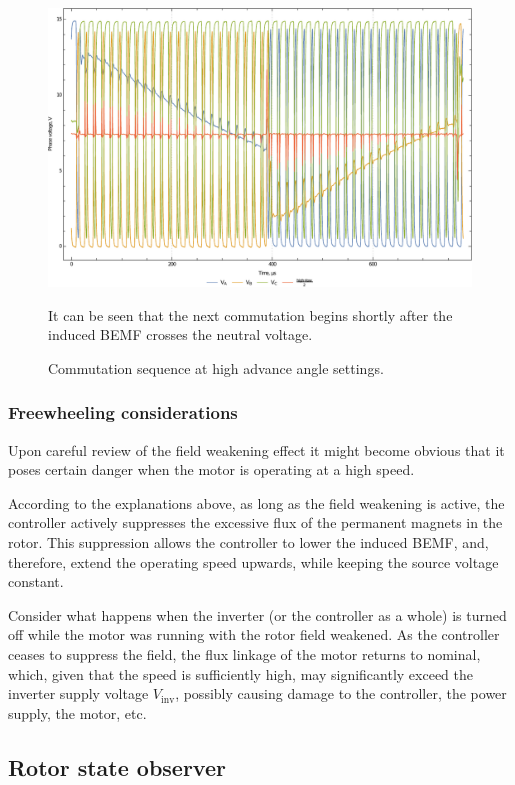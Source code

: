 \documentclass{zubaxdoc}
\begin{document}
\begin{figure}[hbtp]
    \centering
	\includegraphics[width=\textwidth]{phase_voltages_at_high_advance_angle}
	\caption{Commutation sequence at high advance angle settings.
	\label{phase_voltages_at_high_advance_angle}}
	It can be seen that the next commutation begins shortly after the induced BEMF
	crosses the neutral voltage.
\end{figure}

\subsubsection{Freewheeling considerations}

Upon careful review of the field weakening effect it might become obvious that it poses certain danger
when the motor is operating at a high speed.

According to the explanations above, as long as the field weakening is active,
the controller actively suppresses the excessive flux of the permanent magnets in the rotor.
This suppression allows the controller to lower the induced BEMF, and, therefore,
extend the operating speed upwards, while keeping the source voltage constant.

Consider what happens when the inverter (or the controller as a whole) is turned off while the
motor was running with the rotor field weakened.
As the controller ceases to suppress the field, the flux linkage of the motor returns to nominal,
which, given that the speed is sufficiently high, may significantly exceed the inverter supply
voltage $V_\text{inv}$, possibly causing damage to the controller, the power supply, the motor, etc.

\subsection{Rotor state observer}
\end{document}
